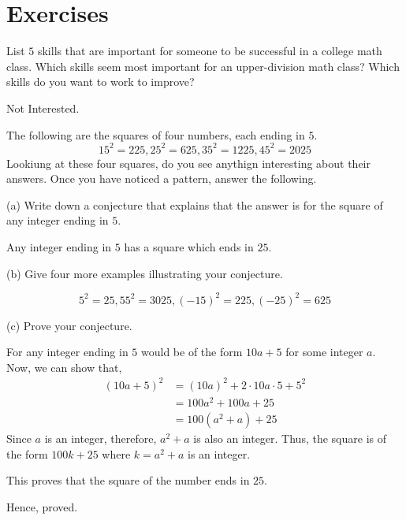 \section*{Exercises}

\begin{problem}
	List $5$ skills that are important for someone to be successful in a college math class. Which skills seem most important for an upper-division math class? Which skills do you want to work to improve?
\end{problem}
\begin{solution}Not Interested.\end{solution}

\begin{problem}
	The following are the squares of four numbers, each ending in $5$.
	$$15^2 = 225, 25^2 = 625, 35^2 = 1225, 45^2 = 2025$$
	Lookiung at these four squares, do you see anythign interesting about their answers. Once you have noticed a pattern, answer the following.

	(a) Write down a conjecture that explains that the answer is for the square of any integer ending in $5$.

	\begin{solution}
		\begin{named}[Conjecture]
			Any integer ending in $5$ has a square which ends in $25$.
		\end{named}
	\end{solution}

	(b) Give four more examples illustrating your conjecture.
	\begin{solution}
		$$5^2 = 25, 55^2 = 3025, (-15)^2 = 225, (-25)^2 = 625$$
	\end{solution}

	(c) Prove your conjecture.
	\begin{solution}
		For any integer ending in $5$ would be of the form $10a+5$ for some integer $a$. Now, we can show that,
		\begin{align}
			(10a+5)^2 &= (10a)^2 + 2 \cdot 10a \cdot 5 + 5^2 \\
				&= 100a^2 + 100a + 25 \\
				&= 100(a^2+a) + 25
		\end{align}
		Since $a$ is an integer, therefore, $a^2 + a$ is also an integer.
		Thus, the square is of the form $100k+25$ where $k = a^2+a$ is an integer.

		This proves that the square of the number ends in $25$.

		Hence, proved.
	\end{solution}
\end{problem}

